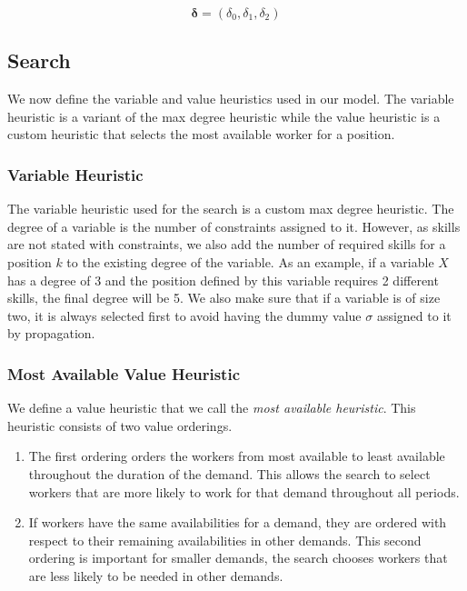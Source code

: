 \documentclass[../../thesis.tex]{subfiles}
\begin{document}
\begin{equation}
  \label{penalties:cp}
  \bm{\delta} = (\delta_0, \delta_1, \delta_2)
\end{equation}




\subsection{Search}

We now define the variable and value heuristics used in our model. The variable heuristic is a variant of the 
max degree heuristic while the value heuristic is a custom heuristic that selects the most available worker for a position.

\subsubsection{Variable Heuristic}

The variable heuristic used for the search is a custom max degree heuristic. 
The degree of a variable is the number of constraints assigned to it. However, as skills are not stated with constraints, 
we also add the number of required skills for a position $k$ to the existing degree of the variable. 
As an example, if a variable $X$ has a degree of 3 and the position defined by this variable requires 2 different skills, the final degree will be 5.
We also make sure that if a variable is of size two, it is always selected first to avoid having the dummy value $\sigma$ assigned to it by 
propagation.


\subsubsection{Most Available Value Heuristic}

We define a value heuristic that we call the \emph{most available heuristic}. 
This heuristic consists of two value orderings.
\begin{enumerate}
  \item The first ordering orders the workers from most available to least available throughout the duration of the demand.
        This allows the search to select workers that are more likely to work for that demand throughout all periods.
  \item If workers have the same availabilities for a demand, they are ordered with respect to their remaining availabilities in other demands. This 
        second ordering is important for smaller demands, the search chooses workers that are less likely to be needed in other demands.
\end{enumerate}
\end{document}
